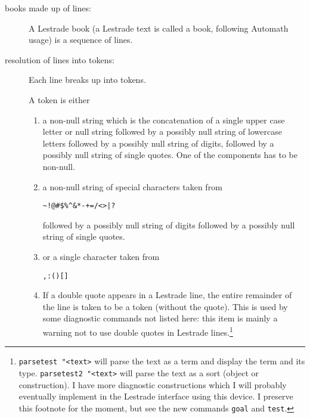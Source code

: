 \documentclass[12pt]{article}
\begin{document}
\begin{description}

\item[books made up of lines:]  A Lestrade book (a Lestrade text is called a book, following Automath usage) is a sequence of lines.

\item[resolution of lines into tokens:]  Each line breaks up into tokens.



A token is either

\begin{enumerate}

\item a non-null string which is the concatenation of a single upper case letter or null string followed by a possibly null string of lowercase letters followed by a possibly null string of digits, followed by a possibly null string of single quotes.
One of the components has to be non-null.

\item a non-null string of special characters taken from

     \begin{verbatim}
~!@#$%^&*-+=/<>|?

\end{verbatim}

followed by a possibly null string of digits followed by a possibly null string of single quotes.

\item or a single character taken from 

     \begin{verbatim}
,:()[]

\end{verbatim}

\item If a double quote appears in a Lestrade line, the entire remainder of the line is taken to be a token (without the quote).  This is used by some diagnostic commands not listed here:  this item is mainly a warning not to use double quotes in Lestrade lines.\footnote{{\tt parsetest "<text>} will parse the text as a term and display the term and its type.  {\tt parsetest2 "<text>} will parse the text as a sort (object or construction).  I have more diagnostic constructions which I will probably eventually implement in the Lestrade interface using this device.  I preserve this footnote for the moment, but see the new commands {\tt goal} and {\tt test}.}


\end{enumerate}
\end{description}
\end{document}

